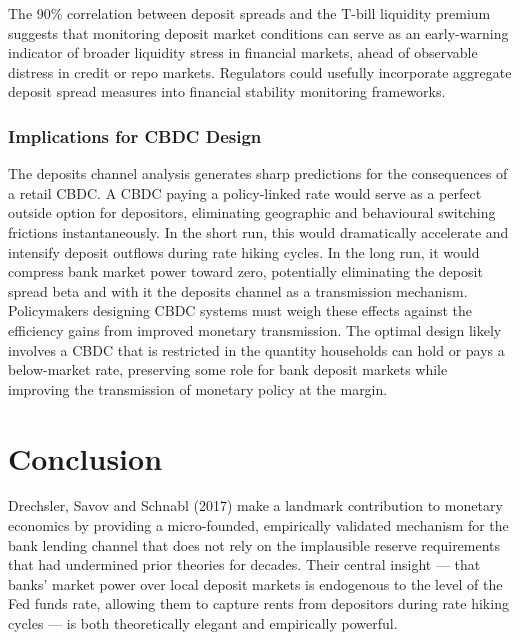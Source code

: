 \documentclass[12pt,a4paper]{article}
\begin{document}
The 90\% correlation between deposit spreads and the T-bill liquidity premium
suggests that monitoring deposit market conditions can serve as an early-warning
indicator of broader liquidity stress in financial markets, ahead of observable
distress in credit or repo markets. Regulators could usefully incorporate
aggregate deposit spread measures into financial stability monitoring frameworks.

\subsubsection{Implications for CBDC Design}

The deposits channel analysis generates sharp predictions for the consequences
of a retail CBDC. A CBDC paying a policy-linked rate would serve as a perfect
outside option for depositors, eliminating geographic and behavioural switching
frictions instantaneously. In the short run, this would dramatically accelerate
and intensify deposit outflows during rate hiking cycles. In the long run, it
would compress bank market power toward zero, potentially eliminating the
deposit spread beta and with it the deposits channel as a transmission
mechanism. Policymakers designing CBDC systems must weigh these effects against
the efficiency gains from improved monetary transmission. The optimal design
likely involves a CBDC that is restricted in the quantity households can hold
or pays a below-market rate, preserving some role for bank deposit markets
while improving the transmission of monetary policy at the margin.

\section{Conclusion}
\label{sec:conclusion}

Drechsler, Savov and Schnabl (2017) make a landmark contribution to monetary
economics by providing a micro-founded, empirically validated mechanism for
the bank lending channel that does not rely on the implausible reserve
requirements that had undermined prior theories for decades. Their central
insight --- that banks' market power over local deposit markets is endogenous
to the level of the Fed funds rate, allowing them to capture rents from
depositors during rate hiking cycles --- is both theoretically elegant and
empirically powerful.
\end{document}
